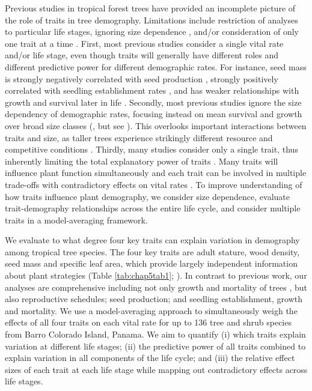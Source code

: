 \documentclass[b5paper,justified]{tufte-book} %
\begin{document}
\begin{fullwidth}
Previous studies in tropical forest trees have provided an incomplete picture of the role of traits in tree demography. Limitations include restriction of analyses to particular life stages, ignoring size dependence \citep{Poorter2008, Wright2010}, and/or consideration of only one trait at a time \citep{Iida2014,Iida2014a}. First, most previous studies consider a single vital rate and/or life stage, even though traits will generally have different roles and different predictive power for different demographic rates. For instance, seed mass is strongly negatively correlated with seed production \citep{Muller-Landau2008}, strongly positively correlated with
seedling establishment rates \citep{Moles2006}, and has weaker relationships with growth and survival later in
life \citep{Wright2010}.  Secondly, most previous studies ignore the size dependency of demographic rates, focusing instead on mean survival and growth over broad size classes (\citealt{Poorter2008, Wright2010}, but see \citealt{Iida2014a}). This overlooks important interactions between traits and size, as taller trees experience strikingly different resource and competitive conditions \citep{Poorter2005, Herault2011, Falster2016}. Thirdly, many studies consider only a single trait, thus inherently limiting the total explanatory power of traits \citep{Muller-Landau2008, Iida2014a,Iida2014}. Many traits will influence plant function simultaneously and each trait can be involved in multiple trade-offs with contradictory effects on vital rates \citep{Marks2006}. To improve understanding of how traits influence plant demography, we consider size dependence, evaluate trait-demography relationships across the entire life cycle, and consider multiple traits in a model-averaging framework.

We evaluate to what degree four key traits can explain variation in demography among tropical tree species. The
four key traits are adult stature, wood density, seed mass and specific leaf area, which provide largely independent
information about plant strategies (Table \ref{tab:chap5tab1}; \citealt{Westoby2002, Wright2007}). In contrast to previous work, our analyses are comprehensive including not only growth and mortality of trees \citep{Poorter2008,  Wright2010, Rueger2012, Iida2014}, but also reproductive schedules; seed production; and seedling establishment, growth and mortality. We use a model-averaging approach \citep{Burnham2002, Grueber2011} to simultaneously weigh the effects of all four traits on each vital rate for up to 136 tree and shrub species from Barro Colorado Island, Panama. We aim to quantify (i) which traits explain variation at different life stages; (ii) the predictive power of all traits combined to explain variation in all components of the life cycle; and (iii) the relative effect sizes of each trait at each life stage while mapping out contradictory effects across life stages.



\end{fullwidth}
\end{document}

